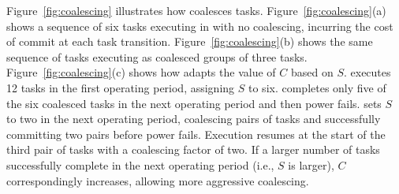 Figure~\ref{fig:coalescing} illustrates how \sys coalesces tasks.
Figure~\ref{fig:coalescing}(a) shows a sequence of six tasks executing in \sys
with no coalescing, incurring the cost of commit at each task transition.
Figure~\ref{fig:coalescing}(b) shows the same sequence of tasks executing as
coalesced groups of three tasks. Figure~\ref{fig:coalescing}(c) shows how \sys
adapts the value of $C$ based on $S$.  \sys executes 12 tasks in the first
operating period, assigning $S$ to six.  \sys completes only five of the six
coalesced tasks in the next operating period and then power fails. \sys sets
$S$ to two in the next operating period, coalescing pairs of tasks and
successfully committing two pairs before power fails. Execution resumes at the
start of the third pair of tasks with a coalescing factor of two.  If a larger
number of tasks successfully complete in the next operating period (i.e., $S$
is larger), $C$ correspondingly increases, allowing more aggressive coalescing.

